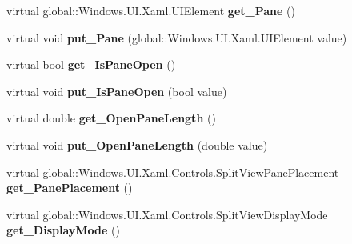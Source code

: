 \begin{DoxyCompactItemize}
virtual global\+::\+Windows.\+U\+I.\+Xaml.\+U\+I\+Element {\bfseries get\+\_\+\+Pane} ()
\item 
\mbox{\label{class_windows_1_1_u_i_1_1_xaml_1_1_controls_1_1_split_view_a8c4b09d201319f93f6bc55c355264db6}} 
virtual void {\bfseries put\+\_\+\+Pane} (global\+::\+Windows.\+U\+I.\+Xaml.\+U\+I\+Element value)
\item 
\mbox{\label{class_windows_1_1_u_i_1_1_xaml_1_1_controls_1_1_split_view_a0f921a26afd4e2d74579c00a1ab97dee}} 
virtual bool {\bfseries get\+\_\+\+Is\+Pane\+Open} ()
\item 
\mbox{\label{class_windows_1_1_u_i_1_1_xaml_1_1_controls_1_1_split_view_ab5edefa99b08ffbc412d0e00aa5b531c}} 
virtual void {\bfseries put\+\_\+\+Is\+Pane\+Open} (bool value)
\item 
\mbox{\label{class_windows_1_1_u_i_1_1_xaml_1_1_controls_1_1_split_view_a854842b7daf878725df6c255d01fc31e}} 
virtual double {\bfseries get\+\_\+\+Open\+Pane\+Length} ()
\item 
\mbox{\label{class_windows_1_1_u_i_1_1_xaml_1_1_controls_1_1_split_view_a5fbb9c9badd343958b2257ca2eb5a0f2}} 
virtual void {\bfseries put\+\_\+\+Open\+Pane\+Length} (double value)
\item 
\mbox{\label{class_windows_1_1_u_i_1_1_xaml_1_1_controls_1_1_split_view_ae136f8940aa8871c0d28d1eb593a4a29}} 
virtual global\+::\+Windows.\+U\+I.\+Xaml.\+Controls.\+Split\+View\+Pane\+Placement {\bfseries get\+\_\+\+Pane\+Placement} ()
\item 
\mbox{\label{class_windows_1_1_u_i_1_1_xaml_1_1_controls_1_1_split_view_af29bc8fd9090a72aea2eaf4b3f2c0a30}} 
virtual global\+::\+Windows.\+U\+I.\+Xaml.\+Controls.\+Split\+View\+Display\+Mode {\bfseries get\+\_\+\+Display\+Mode} ()
\item 
\mbox{\label{class_windows_1_1_u_i_1_1_xaml_1_1_controls_1_1_split_view_a1b48b7569672c2b406106e1b2c94556b}} 

\end{DoxyCompactItemize}
